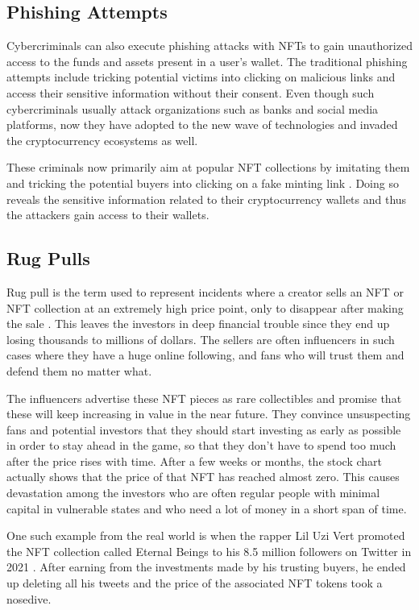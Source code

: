 \documentclass[12pt]{article}
\begin{document}
\subsection{Phishing Attempts}
Cybercriminals can also execute phishing attacks with NFTs to gain unauthorized access to the funds and assets present in a user’s wallet. The traditional phishing attempts include tricking potential victims into clicking on malicious links and access their sensitive information without their consent. Even though such cybercriminals usually attack organizations such as banks and social media platforms, now they have adopted to the new wave of technologies and invaded the cryptocurrency ecosystems as well. 

These criminals now primarily aim at popular NFT collections by imitating them and tricking the potential buyers into clicking on a fake minting link \cite{roy2023demystifying}. Doing so reveals the sensitive information related to their cryptocurrency wallets and thus the attackers gain access to their wallets. 

\subsection{Rug Pulls}
Rug pull is the term used to represent incidents where a creator sells an NFT or NFT collection at an extremely high price point, only to disappear after making the sale \cite{das2022understanding}. This leaves the investors in deep financial trouble since they end up losing thousands to millions of dollars. The sellers are often influencers in such cases where they have a huge online following, and fans who will trust them and defend them no matter what. 

The influencers advertise these NFT pieces as rare collectibles and promise that these will keep increasing in value in the near future. They convince unsuspecting fans and potential investors that they should start investing as early as possible in order to stay ahead in the game, so that they don’t have to spend too much after the price rises with time. After a few weeks or months, the stock chart actually shows that the price of that NFT has reached almost zero. This causes devastation among the investors who are often regular people with minimal capital in vulnerable states and who need a lot of money in a short span of time.

One such example from the real world is when the rapper Lil Uzi Vert promoted the NFT collection called Eternal Beings to his 8.5 million followers on Twitter in 2021 \cite{rauman2021budding}. After earning from the investments made by his trusting buyers, he ended up deleting all his tweets and the price of the associated NFT tokens took a nosedive. 
\end{document}
